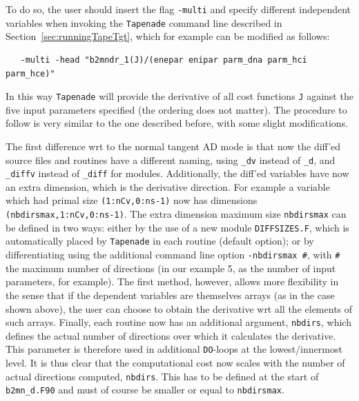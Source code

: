 To do so, the user should insert the flag {\tt -multi} and specify different independent variables when invoking the {\tt Tapenade} command line described in Section~\ref{sec:runningTapeTgt}, which for example can be modified as follows:
\begin{verbatim}
   -multi -head "b2mndr_1(J)/(enepar enipar parm_dna parm_hci parm_hce)"
\end{verbatim}

In this way {\tt Tapenade} will provide the derivative of all cost functions {\tt J} against the five input parameters specified (the ordering does not matter).
The procedure to follow is very similar to the one described before, with some slight modifications.

The first difference wrt to the normal tangent AD mode is that now the diff'ed source files and routines have a different naming, using {\tt \_dv} instead of {\tt \_d}, and {\tt \_diffv} instead of {\tt \_diff} for modules. Additionally, the diff'ed variables have now an extra dimension, which is the derivative direction. For example a variable which had primal size {\tt (1:nCv,0:ns-1)} now has dimensions {\tt (nbdirsmax,1:nCv,0:ns-1)}. The extra dimension maximum size {\tt nbdirsmax} can be defined in two ways: either by the use of a new module {\tt DIFFSIZES.F}, which is automatically placed by {\tt Tapenade} in each routine (default option); or by differentiating using the additional command line option {\tt -nbdirsmax \#}, with {\tt \#} the maximum number of directions (in our example 5, as the number of input parameters, for example). The first method, however, allows more flexibility in the sense that if the dependent variables are themselves arrays (as in the case shown above), the user can choose to obtain the derivative wrt all the elements of such arrays. Finally, each routine now has an additional argument, {\tt nbdirs}, which defines the actual number of directions over which it calculates the derivative. This parameter is therefore used in additional {\tt DO}-loops at the lowest/innermost level. It is thus clear that the computational cost now scales with the number of actual directions computed, {\tt nbdirs}. This has to be defined at the start of {\tt b2mn\_d.F90} and must of course be smaller or equal to {\tt nbdirsmax}.

